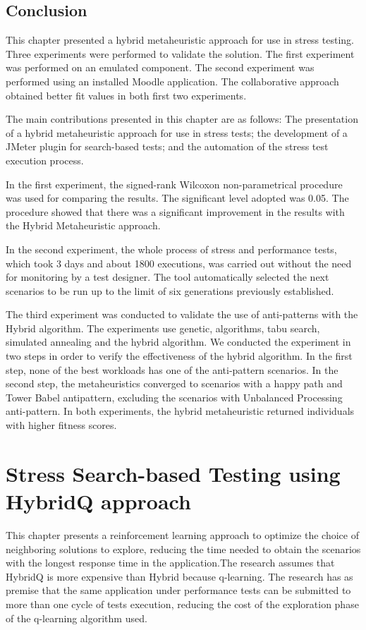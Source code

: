 \documentclass[espaco=umemeio,chapter=TITLE,twoside,openright]{abnt}
\begin{document}
\section{Conclusion}

This chapter presented a hybrid metaheuristic approach for use in stress testing. Three experiments were performed to validate the solution. The first experiment was performed on an emulated component. The second experiment was performed using an installed Moodle application.  The collaborative approach obtained better fit values in both first two experiments.

The main contributions presented in this chapter are as follows: The presentation of a hybrid metaheuristic approach for use in stress tests; the development of a JMeter plugin  for search-based tests; and  the automation of the stress test execution process.

In the first experiment, the signed-rank Wilcoxon non-parametrical procedure was used for comparing the results. The significant level adopted was 0.05. The procedure showed that there was a significant improvement in the results with the Hybrid Metaheuristic approach.

In the second experiment, the whole process of stress and performance tests, which took 3 days and about 1800 executions, was carried out without the need for monitoring by a test designer. The tool automatically selected the next scenarios to be run up to the limit of six generations previously established.

The third experiment was conducted to validate the use of anti-patterns with the Hybrid algorithm. The experiments use genetic, algorithms, tabu search, simulated annealing and the hybrid algorithm.  We conducted the experiment in two steps in order to verify the effectiveness of the hybrid algorithm.  In the first step, none of the best workloads has one of the anti-pattern scenarios. In the second step,  the metaheuristics converged to scenarios with a happy path and Tower Babel antipattern, excluding the scenarios with Unbalanced Processing anti-pattern. In both experiments, the hybrid metaheuristic returned individuals with higher fitness scores. 


\chapter{Stress Search-based Testing using HybridQ approach}


This chapter presents a reinforcement learning approach to optimize the choice of neighboring solutions to explore, reducing the time needed to obtain the scenarios with the longest response time in the application.The research assumes that HybridQ is more expensive than Hybrid because q-learning. The research has as premise that the same application under performance tests can be submitted to more than one cycle of tests execution, reducing the cost of the exploration phase of the q-learning algorithm used. 
\end{document}
